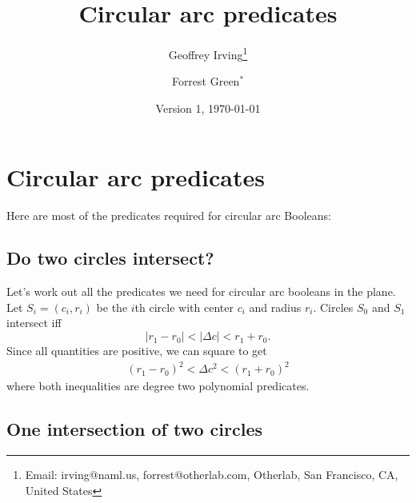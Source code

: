 \documentclass[11pt]{article}
\title{Circular arc predicates}
\author{Geoffrey Irving\thanks{Email: irving@naml.us, forrest@otherlab.com, Otherlab, San Francisco, CA, United States}
\and Forrest Green$^*$}
\date{Version 1, \today}
\begin{document}
\maketitle

\section{Circular arc predicates}

Here are most of the predicates required for circular arc Booleans:

\subsection{Do two circles intersect?}

Let's work out all the predicates we need for circular arc booleans in the plane.  Let $S_i = (c_i,r_i)$ be the $i$th
circle with center $c_i$ and radius $r_i$.  Circles $S_0$ and $S_1$ intersect iff
$$ | r_1 - r_0 | < |\Delta c| < r_1 + r_0. $$
Since all quantities are positive, we can square to get
\begin{align*}
(r_1 - r_0)^2 < \Delta c^2 < (r_1 + r_0)^2
\end{align*}
where both inequalities are degree two polynomial predicates.

\subsection{One intersection of two circles}
\end{document}
